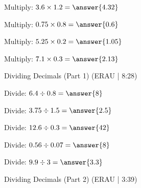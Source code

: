 \documentclass{ximera}
\begin{document}
\begin{problem}
Multiply: $3.6 \times 1.2 = \answer{4.32}$
\end{problem}

\begin{problem}
Multiply: $0.75 \times 0.8 = \answer{0.6}$
\end{problem}

\begin{problem}
Multiply: $5.25 \times 0.2 = \answer{1.05}$
\end{problem}

\begin{problem}
Multiply: $7.1 \times 0.3 = \answer{2.13}$
\end{problem}


\begin{problem}
Dividing Decimals (Part 1) (ERAU | 8:28)


\end{problem}


\begin{problem}
Divide: $6.4 \div 0.8 = \answer{8}$
\end{problem}

\begin{problem}
Divide: $3.75 \div 1.5 = \answer{2.5}$
\end{problem}

\begin{problem}
Divide: $12.6 \div 0.3 = \answer{42}$
\end{problem}

\begin{problem}
Divide: $0.56 \div 0.07 = \answer{8}$
\end{problem}

\begin{problem}
Divide: $9.9 \div 3 = \answer{3.3}$
\end{problem}


\begin{problem}
Dividing Decimals (Part 2) (ERAU | 3:39)


\end{problem}

\end{document}
